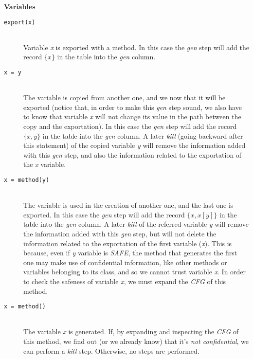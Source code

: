 \documentclass[letterpaper,twocolumn,10pt]{article}
\begin{document}
\noindent \textbf{Variables}
\begin{description}

\item[\texttt{export(x)}] \hfill \\
Variable \emph{x} is exported with a method. In this case the \emph{gen} step will add the record $\{x\}$ in the table into the \emph{gen} column.

\item[\texttt{x = y}] \hfill \\
The variable is copied from another one, and we now that it will be exported (notice that, in order to make this \emph{gen} step sound, we also have to know that variable \emph{x} will not change its value in the path between the copy and the exportation). In this case the \emph{gen} step will add the record $\{x, y\}$ in the table into the \emph{gen} column. A later \emph{kill} (going backward after this statement) of the copied variable \emph{y} will remove the information added with this \emph{gen} step, and also the information related to the exportation of the \emph{x}  variable.

\item[\texttt{x = method(y)}] \hfill \\
The variable is used in the creation of another one, and the last one is exported. In this case the \emph{gen} step will add the record $\{x, x[y]\}$ in the table into the \emph{gen} column. A later \emph{kill} of the referred variable \emph{y} will remove the information added with this \emph{gen} step, but will not delete the information related to the exportation of the first variable (\emph{x}). This is because, even if \emph{y} variable is \emph{SAFE}, the method that generates the first one may make use of confidential information, like other methods or variables belonging to its class, and so we cannot trust variable \emph{x}. In order to check the safeness of variable \emph{x}, we must expand the \emph{CFG} of this method.

\item[\texttt{x = method()}] \hfill \\
The variable \emph{x} is generated. If, by expanding and inspecting the \emph{CFG} of this method, we find out (or we already know) that it's \emph{not confidential}, we can perform a \emph{kill} step. Otherwise, no steps are performed.

\end{description}
\end{document}
